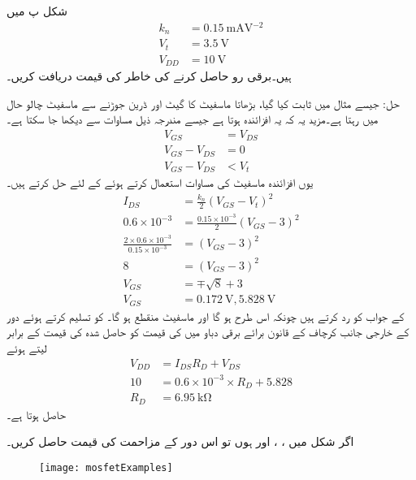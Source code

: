 
شکل  پ میں
\begin{align*}
k_n&=\SI{0.15}{\milli \ampere \volt^{-2}}\\
V_t&=\SI{3.5}{\volt}\\
V_{DD}&=\SI{10}{\volt}
\end{align*}
ہیں۔برقی رو  حاصل کرنے کی خاطر   کی قیمت دریافت کریں۔

حل:	جیسے مثال   میں ثابت کیا گیا، بڑھاتا  ماسفیٹ کا گیٹ اور ڈرین جوڑنے سے ماسفیٹ چالو حال میں رہتا ہے۔مزید یہ کہ یہ افزائندہ  ہوتا ہے جیسے مندرجہ ذیل مساوات سے دیکھا جا سکتا ہے۔
\begin{align*}
V_{GS}&=V_{DS}\\
V_{GS}-V_{DS}&=0\\
V_{GS}-V_{DS}&<V_t
\end{align*}
یوں افزائندہ ماسفیٹ کی مساوات استعمال کرتے ہوئے   کے لئے حل کرتے ہیں۔
\begin{align*}
I_{DS}&=\frac{k_n}{2}\left(V_{GS}-V_t \right )^2 \\
0.6 \times 10^{-3}&=\frac{0.15 \times 10^{-3}}{2} \left(V_{GS}-3 \right )^{2}\\
\frac{2 \times 0.6 \times 10^{-3}}{0.15 \times 10^{-3}}&=\left(V_{GS}-3 \right )^2 \\
8&=\left(V_{GS}-3 \right )^2 \\ 
V_{GS}&=\mp \sqrt{8} +3\\
V_{GS}&=\SI{0.172}{\volt}, \SI{5.828}{\volt}
\end{align*}
 کے جواب کو رد کرتے ہیں چونکہ اس طرح   ہو گا اور ماسفیٹ منقطع ہو گا۔  کو تسلیم کرتے ہوئے دور کے خارجی جانب کرچاف کے قانون برائے برقی دباو میں  کی قیمت کو حاصل شدہ   کی قیمت کے برابر لیتے ہوئے
\begin{align*}
V_{DD}&=I_{DS}R_{D} +V_{DS}\\
10&=0.6 \times 10^{-3} \times R_{D}+5.828\\
R_{D}&=\SI{6.95}{\kilo \ohm}
\end{align*}
حاصل ہوتا ہے۔


اگر شکل  میں  ، ،  اور  ہوں تو اس دور کے مزاحمت کی قیمت حاصل کریں۔
\begin{figure}
\centering
\texttt{[image: mosfetExamples]}
\caption{}
\label{شکل_ماسفیٹ_کے_یک_سمتی_ادوار_مثالیں}
\end{figure}

